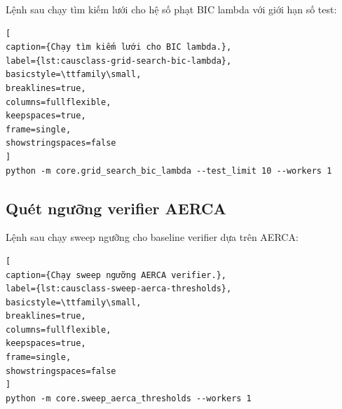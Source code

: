 Lệnh sau chạy tìm kiếm lưới cho hệ số phạt BIC lambda với giới hạn số test:

\begin{lstlisting}[
caption={Chạy tìm kiếm lưới cho BIC lambda.},
label={lst:causclass-grid-search-bic-lambda},
basicstyle=\ttfamily\small,
breaklines=true,
columns=fullflexible,
keepspaces=true,
frame=single,
showstringspaces=false
]
python -m core.grid_search_bic_lambda --test_limit 10 --workers 1
\end{lstlisting}

\subsection{Quét ngưỡng verifier AERCA}

Lệnh sau chạy sweep ngưỡng cho baseline verifier dựa trên AERCA:

\begin{lstlisting}[
caption={Chạy sweep ngưỡng AERCA verifier.},
label={lst:causclass-sweep-aerca-thresholds},
basicstyle=\ttfamily\small,
breaklines=true,
columns=fullflexible,
keepspaces=true,
frame=single,
showstringspaces=false
]
python -m core.sweep_aerca_thresholds --workers 1
\end{lstlisting}